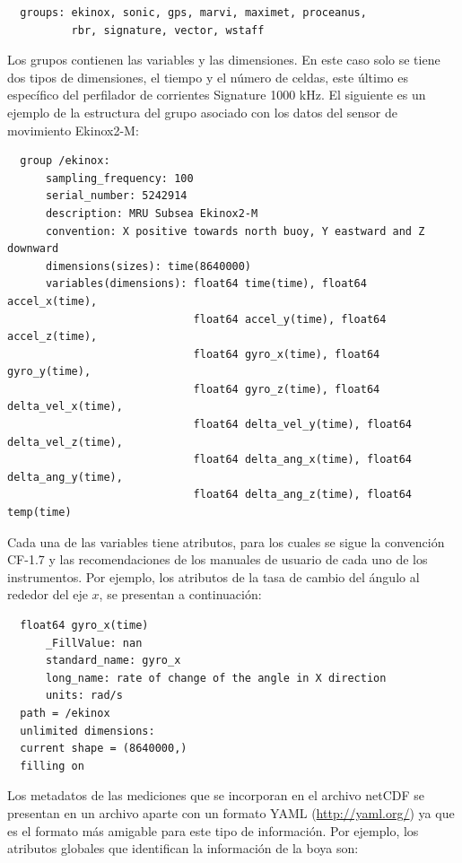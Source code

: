 \documentclass[11pt]{article}
\begin{document}
\begin{verbatim}
  groups: ekinox, sonic, gps, marvi, maximet, proceanus,
          rbr, signature, vector, wstaff
\end{verbatim}

Los grupos contienen las variables y las dimensiones. En este caso solo se tiene
dos tipos de dimensiones, el tiempo y el número de celdas, este último es
específico del perfilador de corrientes Signature 1000 kHz. El siguiente es un
ejemplo de la estructura del grupo asociado con los datos del sensor de
movimiento Ekinox2-M:

\begin{verbatim}
  group /ekinox:
      sampling_frequency: 100
      serial_number: 5242914
      description: MRU Subsea Ekinox2-M
      convention: X positive towards north buoy, Y eastward and Z downward
      dimensions(sizes): time(8640000)
      variables(dimensions): float64 time(time), float64 accel_x(time),
                             float64 accel_y(time), float64 accel_z(time),
                             float64 gyro_x(time), float64 gyro_y(time),
                             float64 gyro_z(time), float64 delta_vel_x(time),
                             float64 delta_vel_y(time), float64 delta_vel_z(time),
                             float64 delta_ang_x(time), float64 delta_ang_y(time),
                             float64 delta_ang_z(time), float64 temp(time)
\end{verbatim}

Cada una de las variables tiene atributos, para los cuales se sigue la
convención CF-1.7 y las recomendaciones de los manuales de usuario de cada uno
de los instrumentos. Por ejemplo, los atributos de la tasa de cambio del ángulo
al rededor del eje $x$, se presentan a continuación:

\begin{verbatim}
  float64 gyro_x(time)
      _FillValue: nan
      standard_name: gyro_x
      long_name: rate of change of the angle in X direction
      units: rad/s
  path = /ekinox
  unlimited dimensions:
  current shape = (8640000,)
  filling on
\end{verbatim}

Los metadatos de las mediciones que se incorporan en el archivo netCDF se
presentan en un archivo aparte con un formato YAML (\url{http://yaml.org/}) ya
que es el formato más amigable para este tipo de información. Por ejemplo, los
atributos globales que identifican la información de la boya son:
\end{document}
